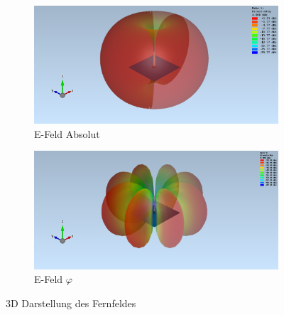\begin{figure}[h!]
	\centering
	\begin{subfigure}[b]{0.48\textwidth}
		\includegraphics[width=1\textwidth]{../fig/plt/monopol_a_sim_3d_eabs.png}
		\caption{E-Feld Absolut}
	\end{subfigure}
	\begin{subfigure}[b]{0.48\textwidth}
		\includegraphics[width=1\textwidth]{../fig/plt/monopol_a_sim_3d_ephi.png}
		\caption{E-Feld $\varphi$}
	\end{subfigure}
	\caption{3D Darstellung des Fernfeldes}
	\label{fig:}
\end{figure}


